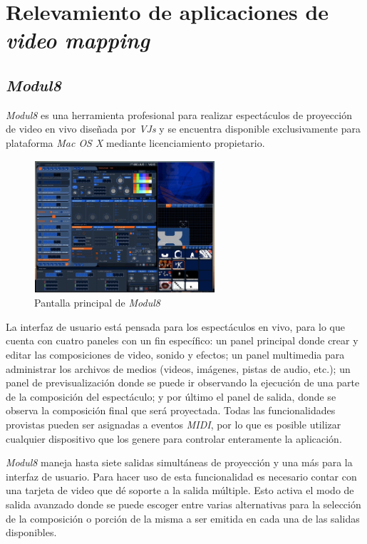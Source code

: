 ﻿\chapter{Relevamiento de aplicaciones de \emph{video mapping}}
\label{chapter:aplicaciones}
\section{\emph{Modul8}}
\emph{Modul8}\cite{Module8} es una herramienta profesional para realizar espectáculos de proyección de video en vivo diseñada por \emph{VJs} y se encuentra disponible exclusivamente para plataforma \emph{Mac OS X} mediante licenciamiento propietario.

\begin{figure}[H]
  \centering
    \includegraphics[width=0.6\textwidth]{./Apendices/Cap3_aplicaciones/apps-modul8.png}
  \caption[http://www.modul8.ch]{Pantalla principal de \emph{Modul8}}
  \label{fig:Apps-Module8}
\end{figure}

La interfaz de usuario está pensada para los espectáculos en vivo, para lo que cuenta con cuatro paneles con un fin específico: un panel principal donde crear y editar las composiciones de video, sonido y efectos; un panel multimedia para administrar los archivos de medios (videos, imágenes, pistas de audio, etc.); un panel de previsualización donde se puede ir observando la ejecución de una parte de la composición del espectáculo; y por último el panel de salida, donde se observa la composición final que será proyectada. Todas las funcionalidades provistas pueden ser asignadas a eventos \emph{MIDI}, por lo que es posible utilizar cualquier dispositivo que los genere para controlar enteramente la aplicación.

\emph{Modul8} maneja hasta siete salidas simultáneas de proyección y una más para la interfaz de usuario. Para hacer uso de esta funcionalidad es necesario contar con una tarjeta de video que dé soporte a la salida múltiple. Esto activa el modo de salida avanzado donde se puede escoger entre varias alternativas para la selección de la composición o porción de la misma a ser emitida en cada una de las salidas disponibles.

